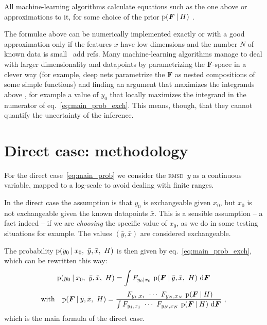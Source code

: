 \documentclass[\ifafour a4paper,12pt,\else a5paper,10pt,\fi%
onecolumn,oneside,article,%
british%
]{memoir}
\theoremstyle{remark}
\theoremstyle{innote}
\newcommand*{\di}{\mathrm{d}}%
\newcommand*{\p}{\mathrm{p}}%
\renewcommand*{\|}[1][]{\nonscript\:#1\vert\nonscript\:\mathopen{}}
\renewcommand*{\=}{\TextOrMath\texteq\eq}
\newcommand*{\eqn}{eq.}%
\newcommand*{\wrench}{{\fontencoding{U}\fontfamily{fontawesomethree}\selectfont\symbol{114}}}
\newcommand{\mynote}[1]{ {\color{notecolour}#1}}
\newcommand*{\rmsd}{\textsc{rmsd}}
\newcommand*{\wy}{\bar{y}}
\newcommand*{\wx}{\bar{x}}
\newcommand*{\yF}{\bm{F}}
\begin{document}
All machine-learning algorithms calculate equations such as the one above
or approximations to it, for some choice of the prior $\p(\yF \| H)$
\parencites{mackay1992,bishop2006}.

The formulae above can be numerically implemented exactly or with a good
approximation only if the features $x$ have low dimensions and the number
$N$ of known data is small \mynote{\wrench\ add refs}. Many
machine-learning algorithms manage to deal with larger dimensionality and
datapoints by parametrizing the $\yF$-space in a clever way (for example,
deep nets parametrize the $\yF$ as nested compositions of some simple
functions) and finding an argument that maximizes the integrands above
\parencites{mackay1992,mackay1992b}, for example a value of $y_{0}$ that
locally maximizes the integrand in the numerator of
\eqn~\eqref{eq:main_prob_exch}. This means, though, that they cannot
quantify the uncertainty of the inference.


\section{Direct case: methodology}
\label{sec:direct_method}

For the direct case~\eqref{eq:main_prob} we consider the \rmsd\ $y$ as a
continuous variable, mapped to a log-scale to avoid dealing with finite
ranges.

In the direct case the assumption is that $y_{0}$ is exchangeable given
$x_{0}$, but $x_{0}$ is not exchangeable given the known datapoints $\wx$.
This is a sensible assumption -- a fact indeed -- if we are \emph{choosing}
the specific value of $x_{0}$, as we do in some testing situations for
example. The values $(\wy,\wx)$ are considered exchangeable.

The probability $\p(y_{0} \| x_{0},\ \wy,\wx,\ H)$ is then given by
\eqn~\eqref{eq:main_prob_exch}, which can be rewritten this way:
\begin{equation}
  \label{eq:direct_case_main}
  \begin{gathered}
  \p(y_{0} \| x_{0},\ \wy,\wx,\ H) =
  \int F_{y_{0}\|x_{0}} \ \p(\yF \| \wy, \wx,\ H)\ \di\yF
  \\[\jot]
  \text{with}\quad
  \p(\yF \| \wy, \wx,\ H) =
  \frac{
    \ F_{y_{1},x_{1}} \  \dotsm \ 
  F_{y_{N},x_{N}} \ \p(\yF \| H)
  }{
    \int F_{y_{1},x_{1}} \  \dotsm \ 
  F_{y_{N},x_{N}} \ \p(\yF \| H)\ \di\yF
  }  \ ,
\end{gathered}
\end{equation}
which is the main formula of the direct case.
\end{document}
